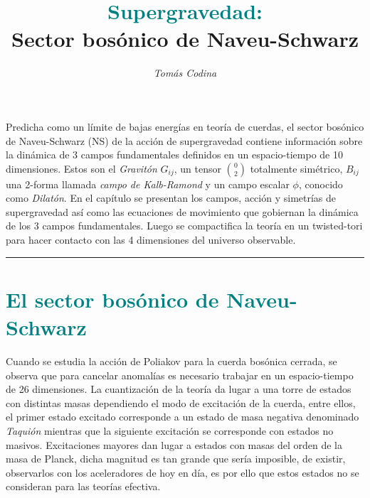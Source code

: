 \documentclass{article}
\title{\vspace{-35pt}\huge{\textbf{\textcolor{teal}{Supergravedad:}}} \\ \vspace{0.1cm} \large{\textbf{Sector bosónico de Naveu-Schwarz}}}
\date{\vspace{-20pt}}
\author{\textit{Tomás Codina}}
\numberwithin{equation}{section}
\begin{document}
	\maketitle
	\thispagestyle{fancy}
	






Predicha como un límite de bajas energías en teoría de cuerdas, el sector bosónico de Naveu-Schwarz (NS) de la acción de supergravedad contiene información sobre la dinámica de 3 campos fundamentales definidos en un espacio-tiempo de 10 dimensiones. Estos son el \textit{Gravitón} $ G_{ij} $, un tensor $ \binom{0}{2} $ totalmente simétrico, $ B_{ij} $ una 2-forma llamada \textit{campo de Kalb-Ramond} y un campo escalar $ \phi $, conocido como \textit{Dilatón}. En el capítulo se presentan los campos, acción y simetrías de supergravedad así como las ecuaciones de movimiento que gobiernan la dinámica de los 3 campos fundamentales. Luego se compactifica la teoría en un twisted-tori para hacer contacto con las 4 dimensiones del universo observable. 

\rule{\textwidth}{0.4pt}

\section{\textcolor{teal}{El sector bosónico de Naveu-Schwarz}}\label{sec_camposaccionysimetrias} %
 
Cuando se estudia la acción de Poliakov para la cuerda bosónica cerrada, se observa que para cancelar anomalías es necesario trabajar en un espacio-tiempo de 26 dimensiones. La cuantización de la teoría da lugar a una torre de estados con distintas masas dependiendo el modo de excitación de la cuerda, entre ellos, el primer estado excitado corresponde a un estado de masa negativa denominado \textit{Taquión} mientras que la siguiente excitación se corresponde con estados no masivos. Excitaciones mayores dan lugar a estados con masas del orden de la masa de Planck, dicha magnitud es tan grande que sería imposible, de existir, observarlos con los aceleradores de hoy en día, es por ello que estos estados no se consideran para las teorías efectiva. 
\end{document}
